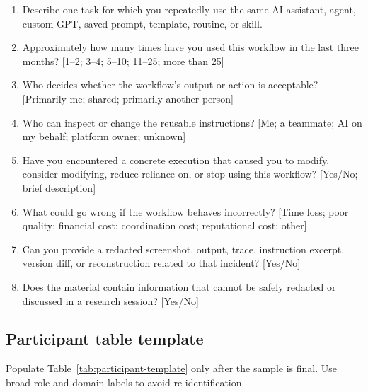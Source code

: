 \begin{enumerate}[leftmargin=*]
    \item Describe one task for which you repeatedly use the same AI assistant,
    agent, custom GPT, saved prompt, template, routine, or skill.
    \item Approximately how many times have you used this workflow in the last
    three months? [1--2; 3--4; 5--10; 11--25; more than 25]
    \item Who decides whether the workflow's output or action is acceptable?
    [Primarily me; shared; primarily another person]
    \item Who can inspect or change the reusable instructions? [Me; a teammate;
    AI on my behalf; platform owner; unknown]
    \item Have you encountered a concrete execution that caused you to modify,
    consider modifying, reduce reliance on, or stop using this workflow?
    [Yes/No; brief description]
    \item What could go wrong if the workflow behaves incorrectly? [Time loss;
    poor quality; financial cost; coordination cost; reputational cost; other]
    \item Can you provide a redacted screenshot, output, trace, instruction
    excerpt, version diff, or reconstruction related to that incident? [Yes/No]
    \item Does the material contain information that cannot be safely redacted
    or discussed in a research session? [Yes/No]
\end{enumerate}

\subsection{Participant table template}

Populate Table~\ref{tab:participant-template} only after the sample is final.
Use broad role and domain labels to avoid re-identification.


